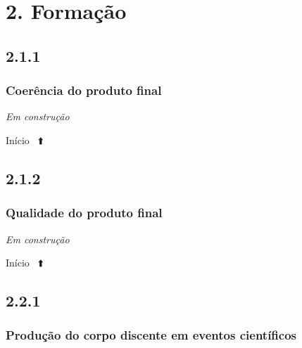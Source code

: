 \documentclass[
  a4paper,
]{book}
\begin{document}
\newpage

\hypertarget{formacao}{%
\section{\texorpdfstring{\textbf{2. Formação}}{2. Formação}}\label{formacao}}

\hypertarget{section-11}{%
\subsection{\texorpdfstring{\textbf{2.1.1}}{2.1.1}}\label{section-11}}

\hypertarget{coeruxeancia-do-produto-final}{%
\subsubsection{\texorpdfstring{\textbf{Coerência do produto final}}{Coerência do produto final}}\label{coeruxeancia-do-produto-final}}

\emph{Em construção}

Início ~⬆️

\hypertarget{section-12}{%
\subsection{\texorpdfstring{\textbf{2.1.2}}{2.1.2}}\label{section-12}}

\hypertarget{qualidade-do-produto-final}{%
\subsubsection{\texorpdfstring{\textbf{Qualidade do produto final}}{Qualidade do produto final}}\label{qualidade-do-produto-final}}

\emph{Em construção}

Início ~⬆️

\hypertarget{section-13}{%
\subsection{\texorpdfstring{\textbf{2.2.1}}{2.2.1}}\label{section-13}}

\hypertarget{produuxe7uxe3o-do-corpo-discente-em-eventos-cientuxedficos}{%
\subsubsection{\texorpdfstring{\textbf{Produção do corpo discente em eventos científicos}}{Produção do corpo discente em eventos científicos}}\label{produuxe7uxe3o-do-corpo-discente-em-eventos-cientuxedficos}}
\end{document}
